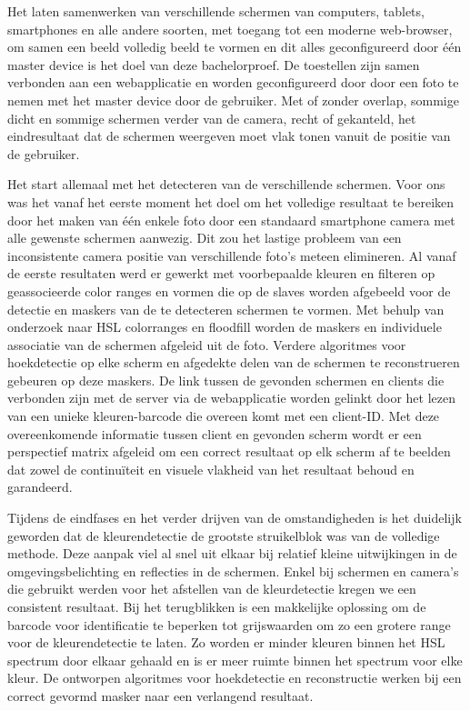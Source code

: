 Het laten samenwerken van verschillende schermen van computers, tablets, smartphones en alle andere soorten, met toegang tot een moderne web-browser, om samen een beeld volledig beeld te vormen en dit alles geconfigureerd door één master device is het doel van deze bachelorproef. De toestellen zijn samen verbonden aan een webapplicatie en worden geconfigureerd door door een foto te nemen met het master device door de gebruiker. Met of zonder overlap, sommige dicht en sommige schermen verder van de camera, recht of gekanteld, het eindresultaat dat de schermen weergeven moet vlak tonen vanuit de positie van de gebruiker.

Het start allemaal met het detecteren van de verschillende schermen. Voor ons was het vanaf het eerste moment het doel om het volledige resultaat te bereiken door het maken van één enkele foto door een standaard smartphone camera met alle gewenste schermen aanwezig. Dit zou het lastige probleem van een inconsistente camera positie van verschillende foto’s meteen elimineren. Al vanaf de eerste resultaten werd er gewerkt met voorbepaalde kleuren en filteren op geassocieerde color ranges en vormen die op de slaves worden afgebeeld voor de detectie en maskers van de te detecteren schermen te vormen. Met behulp van onderzoek naar HSL colorranges en floodfill worden de maskers en individuele associatie van de schermen afgeleid uit de foto. Verdere algoritmes voor hoekdetectie op elke scherm en afgedekte delen van de schermen te reconstrueren gebeuren op deze maskers. De link tussen de gevonden schermen en clients die verbonden zijn met de server via de webapplicatie worden gelinkt door het lezen van een unieke kleuren-barcode die overeen komt met een client-ID. Met deze overeenkomende informatie tussen client en gevonden scherm wordt er een perspectief matrix afgeleid om een correct resultaat op elk scherm af te beelden dat zowel de continuïteit en visuele vlakheid van het resultaat behoud en garandeerd.

Tijdens de eindfases en het verder drijven van de omstandigheden is het duidelijk geworden dat de kleurendetectie de grootste struikelblok was van de volledige methode. Deze aanpak viel al snel uit elkaar bij relatief kleine uitwijkingen in de omgevingsbelichting en reflecties in de schermen. Enkel bij schermen en camera’s die gebruikt werden voor het afstellen van de kleurdetectie kregen we een consistent resultaat. Bij het terugblikken is een makkelijke oplossing om de barcode voor identificatie te beperken tot grijswaarden om zo een grotere range voor de kleurendetectie te laten. Zo worden er minder kleuren binnen het HSL spectrum door elkaar gehaald en is er meer ruimte binnen het spectrum voor elke kleur. De ontworpen algoritmes voor hoekdetectie en reconstructie werken bij een correct gevormd masker naar een verlangend resultaat.
